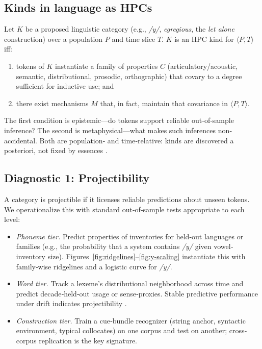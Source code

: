 \documentclass[12pt]{article}
\begin{document}
\subsection{Kinds in language as HPCs}

Let $K$ be a proposed linguistic category (e.g., \textit{/y/}, \textit{egregious}, the \textit{let alone} construction) over a population $P$ and time slice $T$. $K$ is an HPC kind for $\langle P,T\rangle$ iff:

\begin{enumerate}
\item tokens of $K$ instantiate a family of properties $C$ (articulatory/acoustic, semantic, distributional, prosodic, orthographic) that covary to a degree sufficient for inductive use; and
\item there exist mechanisms $M$ that, in fact, maintain that covariance in $\langle P,T\rangle$.
\end{enumerate}

The first condition is epistemic—do tokens support reliable out‐of‐sample inference? The second is metaphysical—what makes such inferences non‐accidental. Both are population‐ and time‐relative: kinds are discovered a posteriori, not fixed by essences \citep{Boyd1991Enthusiasm,Miller2021WordsSpeciesKinds}.

\subsection{Diagnostic 1: Projectibility}\label{sec:projectibility}

A category is projectible if it licenses reliable predictions about unseen tokens. We operationalize this with standard out‐of‐sample tests appropriate to each level:

\begin{itemize}
\item \textit{Phoneme tier.} Predict properties of inventories for held‐out languages or families (e.g., the probability that a system contains \textit{/y/} given vowel‐inventory size). Figures~\ref{fig:ridgelines}–\ref{fig:y-scaling} instantiate this with family‐wise ridgelines and a logistic curve for \textit{/y/}.
\item \textit{Word tier.} Track a lexeme’s distributional neighborhood across time and predict decade‐held‐out usage or sense‐proxies. Stable predictive performance under drift indicates projectibility \citep[mechanism‐first reading in][]{Miller2021WordsSpeciesKinds}.
\item \textit{Construction tier.} Train a cue‐bundle recognizer (string anchor, syntactic environment, typical collocates) on one corpus and test on another; cross‐corpus replication is the key signature.
\end{itemize}
\end{document}
